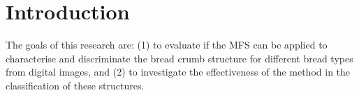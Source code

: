 \documentclass[twocolumn]{bmcart}%
\begin{document}
\begin{frontmatter}
\begin{fmbox}
\begin{abstractbox}
\begin{abstract}
\end{abstract}


\begin{keyword}
\end{keyword}


\end{abstractbox}
%
\end{fmbox}%

\end{frontmatter}



\section{Introduction}
\label{intro}
The goals of this research are: (1) to evaluate if the MFS \cite{Xu2009} can be applied to characterise and discriminate the bread crumb structure for different bread types from digital images, and (2) to investigate the effectiveness of the method in the classification of these structures.
\end{document}
